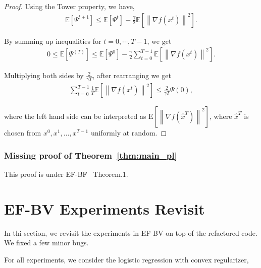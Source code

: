 \documentclass{article} %
\newcommand{\algname}[1]{{\sf\green\relscale{0.90}#1}\xspace}
\newcommand{\eqdef}{\coloneqq}
\theoremstyle{plain}
\theoremstyle{definition}
\theoremstyle{remark}
\newcommand{\green}{\color{mydarkgreen}}
\newcommand{\sqnorm}[1]{\left\| #1 \right\|^2}
\newcommand{\Exp}[1]{\mathbb{E}\!\left[ #1 \right]}
\begin{document}
\begin{proof}
   Using the Tower property, we have,
   \begin{align*}
      \Exp{\Psi^{t+1}} \leq \Exp{\Psi^t} - \frac{\gamma}{2}\Exp{\sqnorm{\nabla f(x^t)}}.
   \end{align*}

   By summing up inequalities for $t=0, \cdots, T-1$, we get 
   \begin{align*}
      0 \leq \Exp{\Psi^(T)} \leq \Exp{\Psi^0} - \frac{\gamma}{2} \sum_{t=0}^{T-1} \Exp{\sqnorm{\nabla f(x^t)}}.
   \end{align*}

   Multiplying both sides by $\frac{2}{\gamma T}$, after rearranging we get
   \begin{align*}
      \sum_{t=0}^{T-1} \frac{1}{T}\Exp{\sqnorm{\nabla f(x^t)}} \leq \frac{2}{\gamma T} \Psi(0),
   \end{align*}

   where the left hand side can be interpreted as $\mathrm{E}\left[\left\|\nabla f\left(\hat{x}^{T}\right)\right\|^{2}\right]$, where $\hat{x}^{T}$ is chosen from $x^{0}, x^{1}, \ldots, x^{T-1}$ uniformly at random.

   \end{proof}

   \subsubsection{Missing proof of Theorem~\ref{thm:main_pl}}
   This proof is under \algname{EF-BF}~\cite{condat2022ef} Theorem.1. 

   \section{EF-BV Experiments Revisit}
   In thi section, we revisit the experiments in \algname{EF-BV} on top of the refactored code. We fixed a few minor bugs.

   For all experiments, we consider the logistic regression with convex regularizer, 
\end{document}
